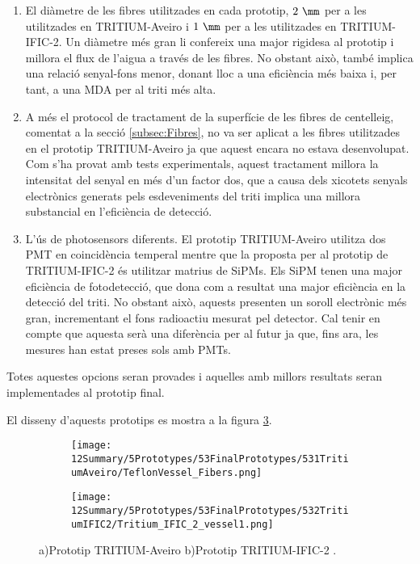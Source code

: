 \begin{enumerate}

\item{} El diàmetre de les fibres utilitzades en cada prototip, $2~\mm$ per a les utilitzades en TRITIUM-Aveiro i $1~\mm$ per a les utilitzades en TRITIUM-IFIC-2. Un diàmetre més gran li confereix una major rigidesa al prototip i millora el flux de l'aigua a través de les fibres. No obstant això, també implica una relació senyal-fons menor, donant lloc a una eficiència més baixa i, per tant, a una MDA per al triti més alta.

\item{} A més el protocol de tractament de la superfície de les fibres de centelleig, comentat a la secció \ref{subsec:Fibres}, no va ser aplicat a les fibres utilitzades en el prototip TRITIUM-Aveiro ja que aquest encara no estava desenvolupat. Com s'ha provat amb tests experimentals, aquest tractament millora la intensitat del senyal en més d'un factor dos, que a causa dels xicotets senyals electrònics generats pels esdeveniments del triti implica una millora substancial en l'eficiència de detecció.


\item{} L'ús de photosensors diferents. El prototip TRITIUM-Aveiro utilitza dos PMT en coincidència temperal mentre que la proposta per al prototip de TRITIUM-IFIC-2 és utilitzar matrius de SiPMs. Els SiPM tenen una major eficiència de fotodetecció, que dona com a resultat una major eficiència en la detecció del triti. No obstant això, aquests presenten un soroll electrònic més gran, incrementant el fons radioactiu mesurat pel detector. Cal tenir en compte que aquesta serà una diferència per al futur ja que, fins ara, les mesures han estat preses sols amb PMTs. 

\end{enumerate} 

Totes aquestes opcions seran provades i aquelles amb millors resultats seran implementades al prototip final. 

El disseny d'aquests prototips es mostra a la figura \ref{fig:PrototipsAveiroIFIC2}.

\begin{figure}
\centering
    \begin{subfigure}[b]{0.5\textwidth}
    \centering
    \texttt{[image: 12Summary/5Prototypes/53FinalPrototypes/531TritiumAveiro/TeflonVessel\_Fibers.png]}  
        \caption{}\label{subfig:PrototipAveiro}
    \end{subfigure}
    \hfill
    \begin{subfigure}[b]{0.5\textwidth}
    \centering
    \texttt{[image: 12Summary/5Prototypes/53FinalPrototypes/532TritiumIFIC2/Tritium\_IFIC\_2\_vessel1.png]}  
    \caption{\label{subfig:PrototipIFIC2}}
    \end{subfigure}
\caption{a)Prototip TRITIUM-Aveiro b)Prototip TRITIUM-IFIC-2 \label{fig:PrototipsAveiroIFIC2}.}
\end{figure}

